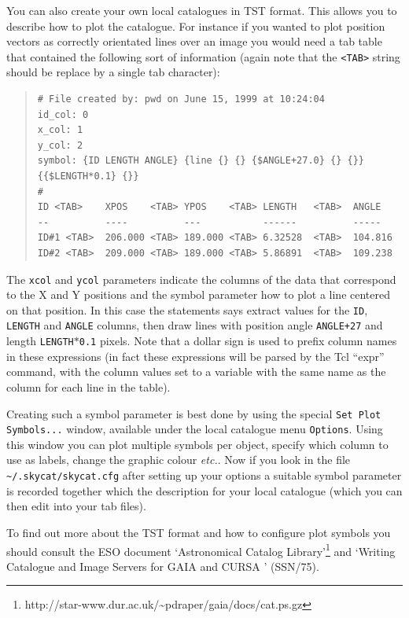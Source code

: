 \documentclass[twoside,11pt]{article}
\newcommand{\htmladdnormallinkfoot}[2]{#1\footnote{#2}}
\newcommand{\xref}[3]{#1}
\renewcommand{\_}{\texttt{\symbol{95}}}
\newcommand{\mytt}[1]{{\texttt{#1}}}
\begin{document}
You can also create your own local catalogues in TST format. This
allows you to describe how to plot the catalogue. For instance if you
wanted to plot position vectors as correctly orientated lines over an
image you would need a tab table that contained the following sort of
information (again note that the \mytt{<TAB>} string should be replace
by a single tab character):
\begin{quote}
\begin{verbatim}
# File created by: pwd on June 15, 1999 at 10:24:04
id_col: 0
x_col: 1
y_col: 2
symbol: {ID LENGTH ANGLE} {line {} {} {$ANGLE+27.0} {} {}} {{$LENGTH*0.1} {}}
#
ID <TAB>    XPOS    <TAB> YPOS    <TAB> LENGTH   <TAB>  ANGLE
--          ----          ---           ------          -----
ID#1 <TAB>  206.000 <TAB> 189.000 <TAB> 6.32528  <TAB>  104.816
ID#2 <TAB>  209.000 <TAB> 189.000 <TAB> 5.86891  <TAB>  109.238
\end{verbatim}
\end{quote}
The \mytt{x\_col} and \mytt{y\_col} parameters indicate the columns of
the data that correspond to the X and Y positions and the symbol
parameter how to plot a line centered on that position. In this case
the statements says extract values for the \mytt{ID}, \mytt{LENGTH}
and \mytt{ANGLE} columns, then draw lines with position angle
\mytt{ANGLE+27} and length \mytt{LENGTH$*$0.1} pixels. Note that a
dollar sign is used to prefix column names in these expressions (in
fact these expressions will be parsed by the Tcl ``expr'' command,
with the column values set to a variable with the same name as the
column for each line in the table).

Creating such a symbol parameter is best done by using the special
\mytt{Set Plot Symbols...} window, available under the local catalogue
menu \mytt{Options}. Using this window you can plot multiple symbols per
object, specify which column to use as labels, change the graphic
colour {\em etc.}. Now if you look in the file
\mytt{\~{}/.skycat/skycat.cfg} after setting up your options a suitable
symbol parameter is recorded together which the description for your
local catalogue (which you can then edit into your tab files).

To find out more about the TST format and how to configure plot
symbols you should consult the ESO document
\htmladdnormallinkfoot{`Astronomical Catalog Library'}
{http://star-www.dur.ac.uk/\~{}pdraper/gaia/docs/cat.ps.gz} and
`Writing Catalogue and Image Servers for GAIA and CURSA '
(\xref{SSN/75}{ssn75}{}).
\end{document}
